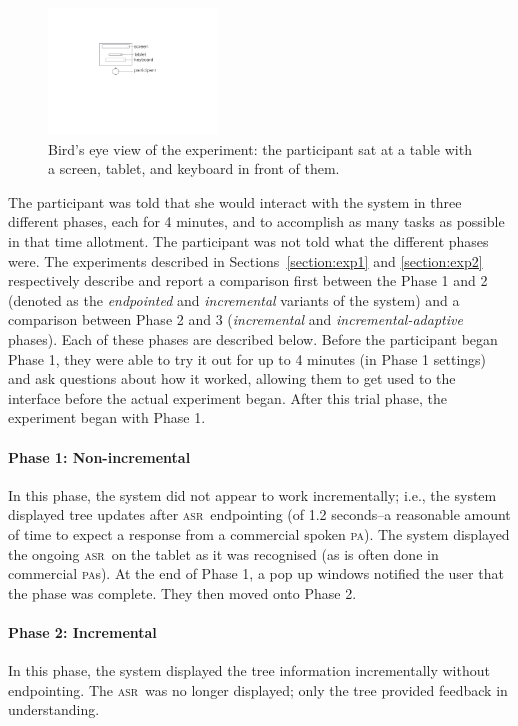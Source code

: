 \documentclass[11pt]{article}
\newcommand{\asr}[0]{\textsc{asr}}
\newcommand{\pa}[0]{\textsc{pa}}
\begin{document}
\begin{figure}[ht]
  \centering
      \includegraphics[width=0.4\textwidth]{figures/dataview.pdf}	
      \caption{Bird's eye view of the experiment: the participant sat at a table with a screen, tablet, and keyboard in front of them. \label{fig:dataview}}
\end{figure}

The participant was told that she would interact with the system in three different phases, each for 4 minutes, and to accomplish as many tasks as possible in that time allotment. The participant was not told what the different phases were. The experiments described in Sections~\ref{section:exp1} and \ref{section:exp2} respectively describe and report a comparison first between the Phase 1 and 2 (denoted as the \emph{endpointed} and \emph{incremental} variants of the system) and a comparison between Phase 2 and 3 (\emph{incremental} and \emph{incremental-adaptive} phases). Each of these phases are described below. Before the participant began Phase 1, they were able to try it out for up to 4 minutes (in Phase 1 settings) and ask questions about how it worked, allowing them to get used to the interface before the actual experiment began. After this trial phase, the experiment began with Phase 1.

\paragraph{Phase 1: Non-incremental} In this phase, the system did not appear to work incrementally; i.e., the system displayed tree updates after \asr\ endpointing (of 1.2 seconds--a reasonable amount of time to expect a response from a commercial spoken \pa). The system displayed the ongoing \asr\ on the tablet as it was recognised (as is often done in commercial \pa s). At the end of Phase 1, a pop up windows notified the user that the phase was complete. They then moved onto Phase 2.

\paragraph{Phase 2: Incremental} In this phase, the system displayed the tree information incrementally without endpointing. The \asr\ was no longer displayed; only the tree provided feedback in understanding. 
\end{document}
